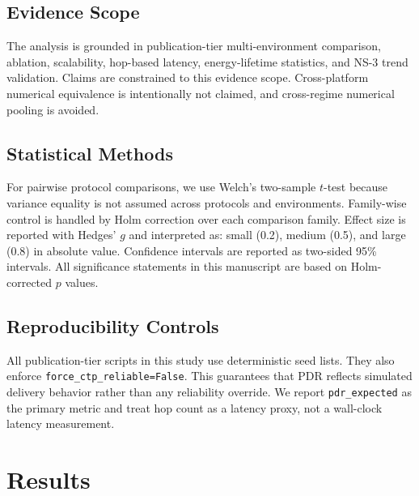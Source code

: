 ﻿\documentclass[sensors,article,submit,moreauthors,pdftex]{Definitions/mdpi}
\begin{document}
\subsection{Evidence Scope}
The analysis is grounded in publication-tier multi-environment comparison, ablation, scalability, hop-based latency, energy-lifetime statistics, and NS-3 trend validation. Claims are constrained to this evidence scope. Cross-platform numerical equivalence is intentionally not claimed, and cross-regime numerical pooling is avoided.

\subsection{Statistical Methods}
For pairwise protocol comparisons, we use Welch's two-sample $t$-test because variance equality is not assumed across protocols and environments. Family-wise control is handled by Holm correction over each comparison family. Effect size is reported with Hedges' $g$ and interpreted as: small (0.2), medium (0.5), and large (0.8) in absolute value. Confidence intervals are reported as two-sided 95\% intervals. All significance statements in this manuscript are based on Holm-corrected $p$ values.

\subsection{Reproducibility Controls}
All publication-tier scripts in this study use deterministic seed lists. They also enforce \texttt{force\_ctp\_reliable=False}. This guarantees that PDR reflects simulated delivery behavior rather than any reliability override. We report \texttt{pdr\_expected} as the primary metric and treat hop count as a latency proxy, not a wall-clock latency measurement.

\section{Results}
\end{document}
